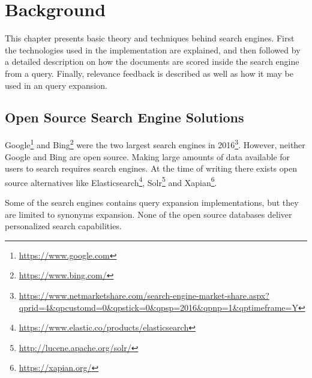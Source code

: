 \chapter{Background}
\label{ch:background}
This chapter presents basic theory and techniques behind search engines. First
the technologies used in the implementation are explained, and then followed by a
detailed description on how the documents are scored inside the search engine from a
query. Finally, relevance feedback is described as well as how it may be used in an query
expansion.

\section{Open Source Search Engine Solutions}
Google\footnote{\url{https://www.google.com}} and Bing\footnote{\url{https://www.bing.com/}}
were the two largest search engines in 2016\footnote{\url{https://www.netmarketshare.com/search-engine-market-share.aspx?qprid=4&qpcustomd=0&qpstick=0&qpsp=2016&qpnp=1&qptimeframe=Y}}.
However, neither Google and Bing are open source.
Making large amounts of data available for users to search requires search engines.
At the time of writing there exists open source alternatives like Elasticsearch\footnote{\url{https://www.elastic.co/products/elasticsearch}},
Solr\footnote{\url{http://lucene.apache.org/solr/}} and Xapian\footnote{\url{https://xapian.org/}}.

Some of the search engines contains query expansion implementations,
but they are limited to synonyms expansion.
None of the open source databases deliver personalized search capabilities.





